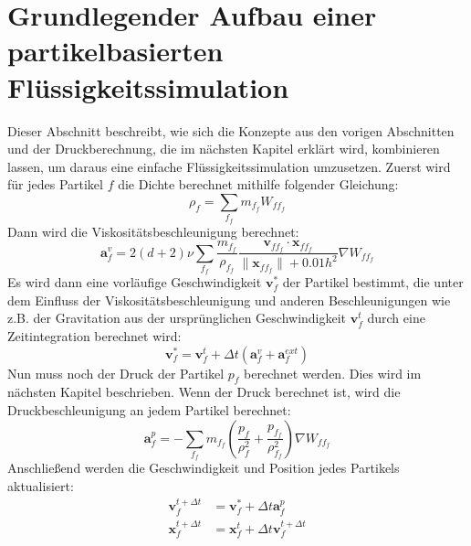 \documentclass{scrreprt}
\begin{document}
\section{Grundlegender Aufbau einer partikelbasierten Flüssigkeitssimulation}
Dieser Abschnitt beschreibt, wie sich die Konzepte aus den vorigen Abschnitten und der Druckberechnung, die im nächsten Kapitel erklärt wird, kombinieren lassen,
um daraus eine einfache Flüssigkeitssimulation umzusetzen.
Zuerst wird für jedes Partikel $f$ die Dichte berechnet mithilfe folgender Gleichung:
\begin{equation}
    \rho_f = \sum_{f_f} m_{f_f} W_{ff_f}
\end{equation}
Dann wird die Viskositätsbeschleunigung berechnet:
\begin{equation}
    \textbf{a}_f^v = 2(d + 2) \nu \sum_{f_f} \frac{m_{f_f}}{\rho_{f_f}} \frac{\textbf{v}_{ff_f} \cdot \textbf{x}_{ff_f}}{\|\textbf{x}_{ff_f}\| + 
    0.01h^2} \nabla W_{ff_f}
\end{equation}
Es wird dann eine vorläufige Geschwindigkeit $\textbf{v}_f^*$ der Partikel bestimmt,
die unter dem Einfluss der Viskositätsbeschleunigung und anderen Beschleunigungen wie z.B. der Gravitation
aus der ursprünglichen Geschwindigkeit $\textbf{v}_f^t$ durch eine Zeitintegration berechnet wird:
\begin{equation}
    \textbf{v}_f^* = \textbf{v}_f^t + \Delta t \left(\textbf{a}_f^v + \textbf{a}_f^{ext}\right)
\end{equation}
Nun muss noch der Druck der Partikel $p_f$ berechnet werden. Dies wird im nächsten Kapitel beschrieben.
Wenn der Druck berechnet ist, wird die Druckbeschleunigung an jedem Partikel berechnet:
\begin{equation}
    \textbf{a}_f^p = -\sum_{f_f} m_{f_f} \left( \frac{p_f}{\rho_f^2} + \frac{p_{f_f}}{\rho_{f_f}^2} \right) \nabla W_{ff_f}
\end{equation}
Anschließend werden die Geschwindigkeit und Position jedes Partikels aktualisiert:
\begin{align}
    \textbf{v}_f^{t + \Delta t} &= \textbf{v}_f^* + \Delta t \textbf{a}_f^p\\
    \textbf{x}_f^{t + \Delta t} &= \textbf{x}_f^t + \Delta t \textbf{v}_f^{t + \Delta t}
\end{align}

\end{document}
